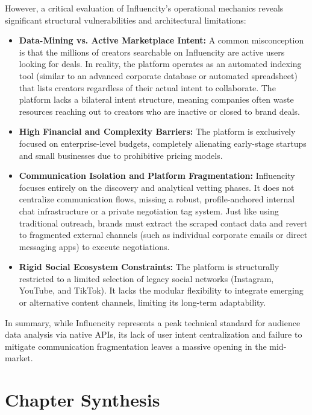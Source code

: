 However, a critical evaluation of Influencity’s operational mechanics reveals significant structural vulnerabilities and architectural limitations:
\begin{itemize}
    \item \textbf{Data-Mining vs. Active Marketplace Intent:} A common misconception is that the millions of creators searchable on Influencity are active users looking for deals. In reality, the platform operates as an automated indexing tool (similar to an advanced corporate database or automated spreadsheet) that lists creators regardless of their actual intent to collaborate. The platform lacks a bilateral intent structure, meaning companies often waste resources reaching out to creators who are inactive or closed to brand deals.
    \item \textbf{High Financial and Complexity Barriers:} The platform is exclusively focused on enterprise-level budgets, completely alienating early-stage startups and small businesses due to prohibitive pricing models.
    \item \textbf{Communication Isolation and Platform Fragmentation:} Influencity focuses entirely on the discovery and analytical vetting phases. It does not centralize communication flows, missing a robust, profile-anchored internal chat infrastructure or a private negotiation tag system. Just like using traditional outreach, brands must extract the scraped contact data and revert to fragmented external channels (such as individual corporate emails or direct messaging apps) to execute negotiations.
    \item \textbf{Rigid Social Ecosystem Constraints:} The platform is structurally restricted to a limited selection of legacy social networks (Instagram, YouTube, and TikTok). It lacks the modular flexibility to integrate emerging or alternative content channels, limiting its long-term adaptability.
\end{itemize}

In summary, while Influencity represents a peak technical standard for audience data analysis via native APIs, its lack of user intent centralization and failure to mitigate communication fragmentation leaves a massive opening in the mid-market. 

\section{Chapter Synthesis}
